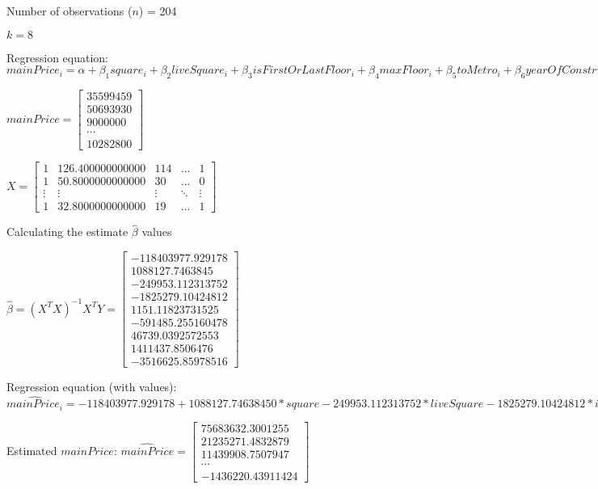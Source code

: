 \documentclass{article}
\begin{document}
Number of observations ($n$) = 204

$k=8$

Regression equation: 
$mainPrice_i=\alpha+\beta_1square_i+\beta_2liveSquare_i+\beta_3isFirstOrLastFloor_i+\beta_4maxFloor_i+\beta_5toMetro_i+\beta_6yearOfConstructuon_i+\beta_7hasElevator_i+\beta_8isNovostroyka_i+\epsilon_i$


$mainPrice=\left[\begin{matrix}35599459\\50693930\\9000000\\\cdots\\10282800\end{matrix}\right]$


$X=\begin{bmatrix}1 & 126.400000000000 & 114 & \dots  & 1 \\ 1 & 50.8000000000000 & 30 & \dots  & 0 \\ \vdots & \vdots & \vdots & \ddots & \vdots \\ 1 & 32.8000000000000 & 19 & \dots  & 1\end{bmatrix}$

Calculating the estimate $\hat\beta$ values

$\hat{\beta}=(X^TX)^{-1}X^TY=\left[\begin{matrix}-118403977.929178\\1088127.7463845\\-249953.112313752\\-1825279.10424812\\1151.11823731525\\-591485.255160478\\46739.0392572553\\1411437.8506476\\-3516625.85978516\end{matrix}\right]$

Regression equation (with values): $\hat{mainPrice_i}=-118403977.929178+1088127.74638450*square-249953.112313752*liveSquare-1825279.10424812*isFirstOrLastFloor+1151.11823731525*maxFloor-591485.255160478*toMetro+46739.0392572553*yearOfConstructuon+1411437.85064760*hasElevator-3516625.85978516*isNovostroyka$


Estimated $mainPrice$: $\hat{mainPrice}=\left[\begin{matrix}75683632.3001255\\21235271.4832879\\11439908.7507947\\\cdots\\-1436220.43911424\end{matrix}\right]$
\end{document}
